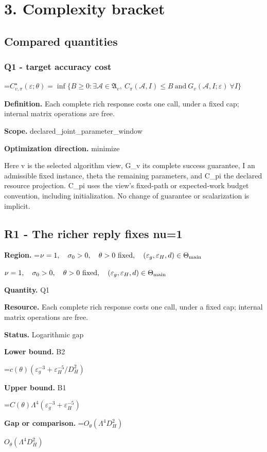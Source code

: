\documentclass[10pt,a4paper]{article}
\newcommand{\AtlasMath}[1]{\par\begingroup\centering\setbox0=\hbox{$\displaystyle #1$}\ifdim\wd0>1.4\linewidth\typeout{ATLAS WIDE FORMULA: \the\wd0}\fi\ifdim\wd0>\linewidth\resizebox{\linewidth}{!}{\box0}\else\box0\fi\par\endgroup}
\newcommand{\AtlasInlineMath}[1]{\begingroup\setbox0=\hbox{$#1$}\ifdim\wd0>.4\linewidth\endgroup\AtlasMath{#1}\else\endgroup$#1$\fi}
\begin{document}
\section{3. Complexity bracket}
\subsection{Compared quantities}
\subsubsection{Q1 - target accuracy cost}
\AtlasMath{C^\star_{v,\pi}(\varepsilon;\theta)=\inf\{B\ge0:\exists\mathcal A\in\mathfrak A_v,\ C_\pi(\mathcal A,I)\le B\ \text{and}\ G_v(\mathcal A,I;\varepsilon)\ \forall I\}}
\textbf{Definition.} Each complete rich response costs one call, under a fixed cap; internal matrix operations are free.

\textbf{Scope.} declared\_joint\_parameter\_window

\textbf{Optimization direction.} minimize

Here v is the selected algorithm view, G\_v its complete success guarantee, I an admissible fixed instance, theta the remaining parameters, and C\_pi the declared resource projection. C\_pi uses the view's fixed-path or expected-work budget convention, including initialization. No change of guarantee or scalarization is implicit.

\subsection{R1 - The richer reply fixes nu=1}
\textbf{Region.} \AtlasInlineMath{\nu=1,\quad\sigma_0>0,\quad\theta>0\ {\rm fixed},\quad(\varepsilon_g,\varepsilon_H,d)\in\Theta_{\rm main}}

\textbf{Quantity.} Q1

\textbf{Resource.} Each complete rich response costs one call, under a fixed cap; internal matrix operations are free.

\textbf{Status.} Logarithmic gap

\textbf{Lower bound.} B2

\AtlasMath{c(\theta)(\varepsilon_g^{-3}+\varepsilon_H^{-5}/D_H^2)}
\textbf{Upper bound.} B1

\AtlasMath{C(\theta)\Lambda^4(\varepsilon_g^{-3}+\varepsilon_H^{-5})}
\textbf{Gap or comparison.} \AtlasInlineMath{O_\theta(\Lambda^4D_H^2)}
\end{document}
